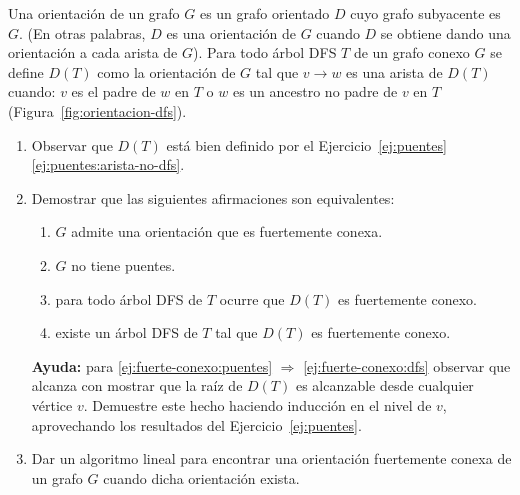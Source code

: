

  
 \item Una orientación de un grafo $G$ es un grafo orientado $D$ cuyo grafo subyacente es $G$.  (En otras palabras, $D$ es una orientación de $G$ cuando $D$ se obtiene dando una orientación a cada arista de $G$).  Para todo árbol DFS $T$ de un grafo conexo $G$ se define $D(T)$ como la orientación de $G$ tal que $v \to w$ es una arista de $D(T)$ cuando: $v$ es el padre de $w$ en $T$ o $w$ es un ancestro no padre de $v$ en $T$ (Figura~\ref{fig:orientacion-dfs}).
 
 \begin{enumerate}[label=$\alph*)$,ref=$\alph*)$]
  \item Observar que $D(T)$ está bien definido por el Ejercicio~\ref{ej:puentes}\ref{ej:puentes:arista-no-dfs}.
  
  \item Demostrar que las siguientes afirmaciones son equivalentes:
   \begin{enumerate}[label=$\roman*)$,ref=$\roman*)$]
    \item $G$ admite una orientación que es fuertemente conexa.\label{ej:fuerte-conexo:orientacion}
    \item $G$ no tiene puentes.\label{ej:fuerte-conexo:puentes}
    \item para todo árbol DFS de $T$ ocurre que $D(T)$ es fuertemente conexo.\label{ej:fuerte-conexo:dfs}
    \item existe un árbol DFS de $T$ tal que $D(T)$ es fuertemente conexo.
  \end{enumerate}
  \textbf{Ayuda:} para \ref{ej:fuerte-conexo:puentes} $\Rightarrow$ \ref{ej:fuerte-conexo:dfs} observar que alcanza con mostrar que la raíz de $D(T)$ es alcanzable desde cualquier vértice $v$.  Demuestre este hecho haciendo inducción en el nivel de $v$, aprovechando los resultados del Ejercicio~\ref{ej:puentes}.
    
  \item Dar un algoritmo lineal para encontrar una orientación fuertemente conexa de un grafo $G$ cuando dicha orientación exista. 
 \end{enumerate}
 
